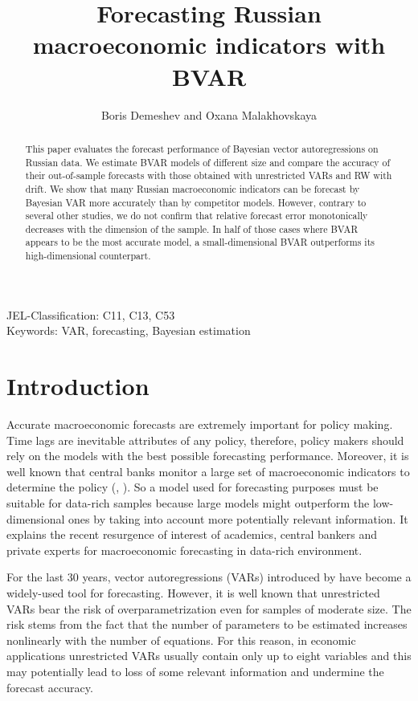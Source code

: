 \documentclass[11pt]{article} %
\title{Forecasting Russian macroeconomic indicators with BVAR}
\author{Boris Demeshev and Oxana Malakhovskaya}
\date{} %
\begin{document}
\maketitle



\begin{abstract}
 This paper evaluates the forecast performance of Bayesian vector autoregressions on Russian data. We estimate BVAR models  of different size and compare the accuracy of their out-of-sample forecasts with those obtained with unrestricted VARs and RW with drift. We show that many Russian macroeconomic indicators can be forecast by Bayesian VAR more accurately than by competitor models. However, contrary to several other studies, we do not confirm that relative forecast error monotonically decreases with the dimension of the sample. In half of those cases where BVAR appears to be the most accurate model, a small-dimensional BVAR outperforms its high-dimensional counterpart. 
 
 \end{abstract}

\smallskip
\noindent JEL-Classification: C11, C13, C53\\
\smallskip
\noindent Keywords: VAR, forecasting, Bayesian estimation

\section{Introduction}

Accurate macroeconomic forecasts are extremely important for policy making. Time lags are inevitable attributes of any policy, therefore, policy makers should rely on the models with the best possible forecasting performance. Moreover, it is well known that central banks monitor a large set of macroeconomic indicators to determine the policy (\cite{beckner_1996}, \cite{bernanke_boivin_2003}). So a model used for forecasting purposes must be suitable for data-rich samples because large models might outperform the low-dimensional ones by taking into account more potentially relevant information. It explains the recent resurgence of interest of academics, central bankers and private experts for macroeconomic forecasting in data-rich environment.

For the last 30 years, vector autoregressions (VARs) introduced by \cite{sims_1980} have become a  widely-used tool for forecasting. However, it is well known that unrestricted VARs bear the risk of overparametrization even for samples of moderate size. The risk stems from the fact that the number of  parameters to be estimated  increases nonlinearly with the number of equations. For this reason, in economic applications unrestricted VARs usually contain  only up to eight variables and this may potentially lead  to loss of some relevant information and undermine the forecast accuracy. 
\end{document}
